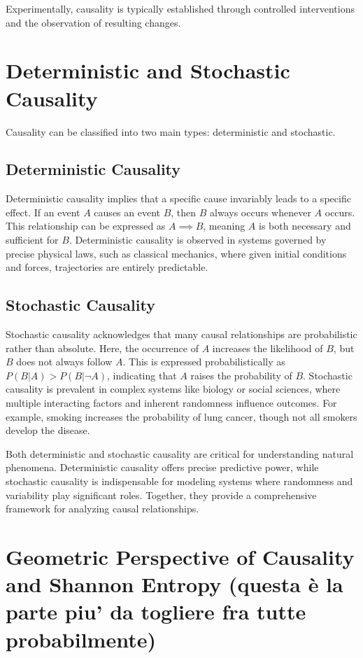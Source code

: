 \documentclass[English, Lau, oneside]{sapthesis}
\begin{document}
Experimentally, causality is typically established through controlled interventions and the observation of resulting changes.
\newpage
\section*{Deterministic and Stochastic Causality}

\noindent Causality can be classified into two main types: deterministic and stochastic.

\subsection*{Deterministic Causality}

\noindent Deterministic causality implies that a specific cause invariably leads to a specific effect. If an event \( A \) causes an event \( B \), then \( B \) always occurs whenever \( A \) occurs. This relationship can be expressed as \( A \implies B \), meaning \( A \) is both necessary and sufficient for \( B \). Deterministic causality is observed in systems governed by precise physical laws, such as classical mechanics, where given initial conditions and forces, trajectories are entirely predictable.

\subsection*{Stochastic Causality}

\noindent Stochastic causality acknowledges that many causal relationships are probabilistic rather than absolute. Here, the occurrence of \( A \) increases the likelihood of \( B \), but \( B \) does not always follow \( A \). This is expressed probabilistically as \( P(B|A) > P(B|\neg A) \), indicating that \( A \) raises the probability of \( B \). Stochastic causality is prevalent in complex systems like biology or social sciences, where multiple interacting factors and inherent randomness influence outcomes. For example, smoking increases the probability of lung cancer, though not all smokers develop the disease.

Both deterministic and stochastic causality are critical for understanding natural phenomena. Deterministic causality offers precise predictive power, while stochastic causality is indispensable for modeling systems where randomness and variability play significant roles. Together, they provide a comprehensive framework for analyzing causal relationships.
\newpage
\section*{Geometric Perspective of Causality and Shannon Entropy (questa è la parte piu' da togliere fra tutte probabilmente)}
\end{document}
